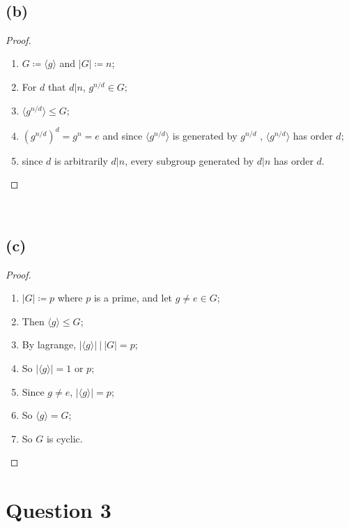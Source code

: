 \documentclass{article}
\begin{document}
~

\subsection*{(b)}

\begin{proof}
    ~
    \begin{enumerate}
        \item $G\coloneqq \langle g\rangle$ and $|G|\coloneqq n$;
        \item For $d$ that $d|n$, $g^{n/d}\in G$;
        \item $\langle g^{n/d}\rangle\leq G$;
        \item ${\left(g^{n/d}\right)}^d=g^n=e$ and since $\langle  g^{n/d}\rangle$ is generated by $g^{n/d}$ , $\langle g^{n/d}\rangle$ has order $d$;
        \item since $d$ is arbitrarily $d|n$, every subgroup generated by $d|n$ has order $d$.
    \end{enumerate}
\end{proof}

~

\subsection*{(c)}

\begin{proof}
    ~
    \begin{enumerate}
        \item $|G|\coloneqq p$ where $p$ is a prime, and let $g\ne e\in G$;
        \item Then $\langle g\rangle \leq G$;
        \item By lagrange, $|\langle g\rangle|\ |\ |G|=p$;
        \item So $|\langle g\rangle|=1$ or $p$;
        \item Since $g\ne e$, $|\langle g\rangle|=p$;
        \item So $\langle g\rangle=G$;
        \item So $G$ is cyclic.
    \end{enumerate}
\end{proof}

\newpage

\section*{Question 3}
\end{document}
